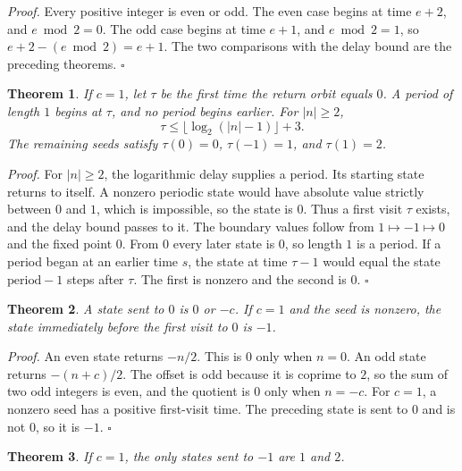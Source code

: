 \documentclass[11pt,letterpaper]{article}
\newtheorem{theorem}{Theorem}
\newenvironment{proof}{\noindent\textit{Proof.}}{\hfill\(\square\)}
\begin{document}
\begin{proof}
Every positive integer is even or odd. The even case begins at time \(e+2\), and \(e \bmod 2=0\). The odd case begins at time \(e+1\), and \(e \bmod 2=1\), so \(e+2-(e \bmod 2)=e+1\). The two comparisons with the delay bound are the preceding theorems.
\end{proof}

\begin{theorem}
\label{thm:negtwoonezero}
If \(c=1\), let \(\tau\) be the first time the return orbit equals \(0\). A period of length \(1\) begins at \(\tau\), and no period begins earlier. For \(\lvert n\rvert\ge2\),
\[
\tau\le\lfloor\log_{2}(\lvert n\rvert-1)\rfloor+3.
\]
The remaining seeds satisfy \(\tau(0)=0\), \(\tau(-1)=1\), and \(\tau(1)=2\).
\end{theorem}

\begin{proof}
For \(\lvert n\rvert\ge2\), the logarithmic delay supplies a period. Its starting state returns to itself. A nonzero periodic state would have absolute value strictly between \(0\) and \(1\), which is impossible, so the state is \(0\). Thus a first visit \(\tau\) exists, and the delay bound passes to it. The boundary values follow from \(1\mapsto-1\mapsto0\) and the fixed point \(0\). From \(0\) every later state is \(0\), so length \(1\) is a period. If a period began at an earlier time \(s\), the state at time \(\tau-1\) would equal the state \(\mathrm{period}-1\) steps after \(\tau\). The first is nonzero and the second is \(0\).
\end{proof}

\begin{theorem}
\label{thm:negtwopredecessor}
A state sent to \(0\) is \(0\) or \(-c\). If \(c=1\) and the seed is nonzero, the state immediately before the first visit to \(0\) is \(-1\).
\end{theorem}

\begin{proof}
An even state returns \(-n/2\). This is \(0\) only when \(n=0\). An odd state returns \(-(n+c)/2\). The offset is odd because it is coprime to \(2\), so the sum of two odd integers is even, and the quotient is \(0\) only when \(n=-c\). For \(c=1\), a nonzero seed has a positive first-visit time. The preceding state is sent to \(0\) and is not \(0\), so it is \(-1\).
\end{proof}

\begin{theorem}
\label{thm:negtwotonegone}
If \(c=1\), the only states sent to \(-1\) are \(1\) and \(2\).
\end{theorem}
\end{document}
